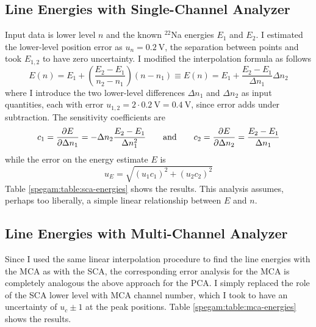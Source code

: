 \documentclass[11pt, a4paper]{article}
\newcommand{\eqtext}[1]{\qquad \text{#1} \qquad}
\newcommand{\isoptope}[2]{${}^{#2}${#1}}
\begin{document}
\subsection{Line Energies with Single-Channel Analyzer}
Input data is lower level $ n $ and the known \isoptope{Na}{22} energies $ E_{1} $ and $ E_{2} $. I estimated the lower-level position error as $ u_{n} = \SI{0.2}{\volt} $, the separation between points and took $ E_{1,2} $ to have zero uncertainty. I modified the interpolation formula as follows
\begin{equation*}
	E(n) = E_{1} + \left(\frac{E_{2}-E_{1}}{n_{2}-n_{1}}\right)(n - n_{1}) \equiv E(n) = E_{1} + \frac{E_{2}-E_{1}}{\Delta n_{1}} \Delta n_{2}
\end{equation*}
where I introduce the two lower-level differences $ \Delta n_{1} $ and $ \Delta n_{2} $ as input quantities, each with error $ u_{1,2} = 2 \cdot \SI{0.2}{\volt} = \SI{0.4}{\volt} $, since error adds under subtraction. The sensitivity coefficients are
\begin{equation*}
	c_{1} = \pdv{E}{\Delta n_{1}} = -\Delta n_{2} \frac{E_{2}-E_{1}}{\Delta n_{1}^{2}} \eqtext{and} c_{2} = \pdv{E}{\Delta n_{2}} = \frac{E_{2}-E_{1}}{\Delta n_{1}}
\end{equation*}
while the error on the energy estimate $ E $ is 
\begin{equation*}
	u_{E} = \sqrt{(u_{1}c_{1})^{2} + (u_{2}c_{2})^{2}}
\end{equation*}
Table \ref{spegam:table:sca-energies} shows the results. This analysis assumes, perhaps too liberally, a simple linear relationship between $ E $ and $ n $.

\subsection{Line Energies with Multi-Channel Analyzer}
Since I used the same linear interpolation procedure to find the line energies with the MCA as with the SCA, the corresponding error analysis for the MCA is completely analogous the above approach for the PCA. I simply replaced the role of the SCA lower level with MCA channel number, which I took to have an uncertainty of $ u_{c} \pm 1 $ at the peak positions. Table \ref{spegam:table:mca-energies} shows the results.
\end{document}
